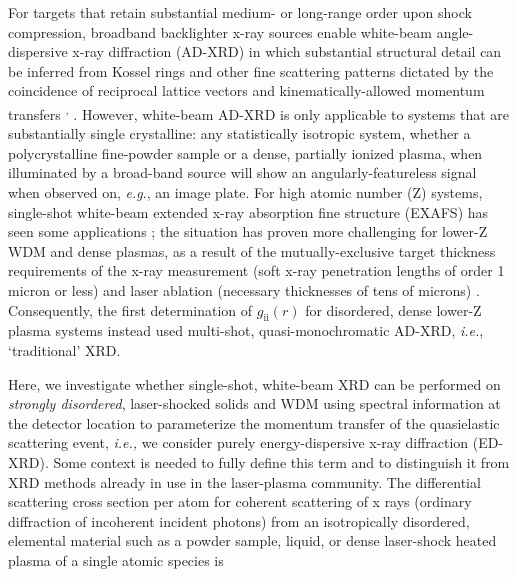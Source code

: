 For targets that retain substantial medium- or long-range order upon
shock compression, broadband backlighter x-ray sources enable white-beam
angle-dispersive x-ray diffraction (AD-XRD) in which substantial
structural detail can be inferred from Kossel rings
\hyperref[v.-lider-crystallography-reports-56-169-2011.]\cite{LIDER2011X}
and other fine scattering patterns dictated by the coincidence of
reciprocal lattice vectors and kinematically-allowed momentum transfers
\hyperref[m.-suggit-g.-kimminau-j.-hawreliak-b.-remington-n.-park-and-j.-wark-review-of-scientific-instruments-81-083902-2010.]\cite{SUGGIT2010NANOSECOND}\textsuperscript{,}
\hyperref[m.-j.-suggit-et-al.-nature-communications-3-1224-2012.]\cite{SUGGIT2012NANOSECOND}.
However, white-beam AD-XRD is only applicable to systems that are
substantially single crystalline: any statistically isotropic system,
whether a polycrystalline fine-powder sample or a dense, partially
ionized plasma, when illuminated by a broad-band source will show an
angularly-featureless signal when observed on, \emph{e.g}., an image
plate. For high atomic number (Z) systems, single-shot white-beam
extended x-ray absorption fine structure (EXAFS) has seen some
applications
\hyperref[b.-yaakobi-t.-r.-boehly-d.-d.-meyerhofer-t.-j.-b.-collins-b.-a.-remington-p.-g.-allen-s.-m.-pollaine-h.-e.-lorenzana-and-j.-h.-eggert-physical-review-letters-95-075501-2005.]\cite{YAAKOBI2005EXAFS};
the situation has proven more challenging for lower-Z WDM and dense
plasmas, as a result of the mutually-exclusive target thickness
requirements of the x-ray measurement (soft x-ray penetration lengths of
order 1 micron or less) and laser ablation (necessary thicknesses of
tens of microns)
\hyperref[j.-l.-bourgade-et-al.-review-of-scientific-instruments-75-4204-2004.]\cite{BOURGADE2004NEW}.
Consequently, the first determination of
\(g_{\text{ii}}\left( r \right)\) for disordered, dense lower-Z plasma
systems
\hyperref[t.-ma-et-al.-physical-review-letters-110-065001-2013.]\cite{MA2013X}
instead used multi-shot, quasi-monochromatic AD-XRD, \emph{i.e.},
`traditional' XRD.

Here, we investigate whether single-shot, white-beam XRD can be
performed on \emph{strongly disordered}, laser-shocked solids and WDM
using spectral information at the detector location to parameterize the
momentum transfer of the quasielastic scattering event, \emph{i.e.,} we
consider purely energy-dispersive x-ray diffraction (ED-XRD). Some
context is needed to fully define this term and to distinguish it from
XRD methods already in use in the laser-plasma community. The
differential scattering cross section per atom for coherent scattering
of x rays (ordinary diffraction of incoherent incident photons) from an
isotropically disordered, elemental material such as a powder sample,
liquid, or dense laser-shock heated plasma of a single atomic species is

